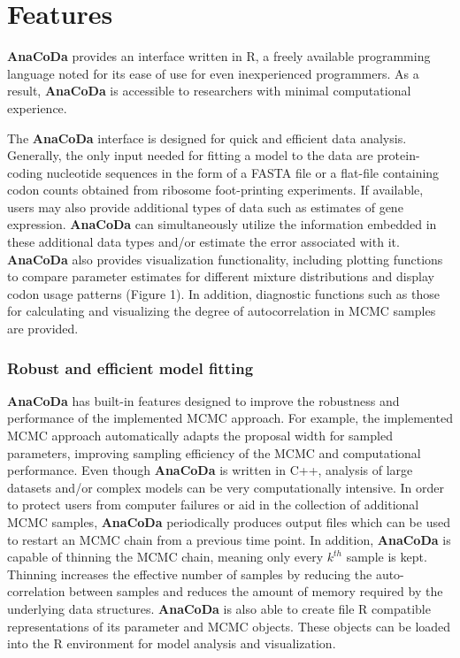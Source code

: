\documentclass{bioinfo}
\newcommand{\package}{\textbf{AnaCoDa }} %
\begin{document}
\section*{Features}
\package provides an interface written in R, a freely available programming language noted for its ease of use for even inexperienced programmers. 
As a result, \package is accessible to researchers with minimal computational experience. 

The \package interface is designed for quick and efficient data analysis.
Generally, the only input needed for fitting a model to the data are protein-coding nucleotide sequences in the form of a FASTA file or a flat-file containing codon counts obtained from ribosome foot-printing experiments. 
If available, users may also provide additional types of data such as estimates of gene expression.
\package can simultaneously utilize the information embedded in these additional data types and/or estimate the error associated with it.
\package also provides visualization functionality, including plotting functions to compare parameter estimates for different mixture distributions and display codon usage patterns (Figure 1). In addition, diagnostic functions such as those for calculating and visualizing the degree of autocorrelation in MCMC samples are provided.

\subsubsection*{Robust and efficient model fitting}
\package has built-in features designed to improve the robustness and performance of the implemented MCMC approach. 
For example, the implemented MCMC approach automatically adapts the proposal width for sampled parameters, improving sampling efficiency of the MCMC and computational performance.
Even though \package is written in C++, analysis of large datasets and/or complex models can be very computationally intensive.
In order to protect users from computer failures or aid in the collection of additional MCMC samples, \package periodically produces output files which can be used to restart an MCMC chain from a previous time point.
In addition, \package is capable of thinning the MCMC chain, meaning only every $k^{th}$ sample is kept. 
Thinning increases the effective number of samples by reducing the auto-correlation between samples and reduces the amount of memory required by the underlying data structures. 
\package is also able to create file R compatible representations of its parameter and MCMC objects.
These objects can be loaded into the R environment for model analysis and visualization.
\end{document}
